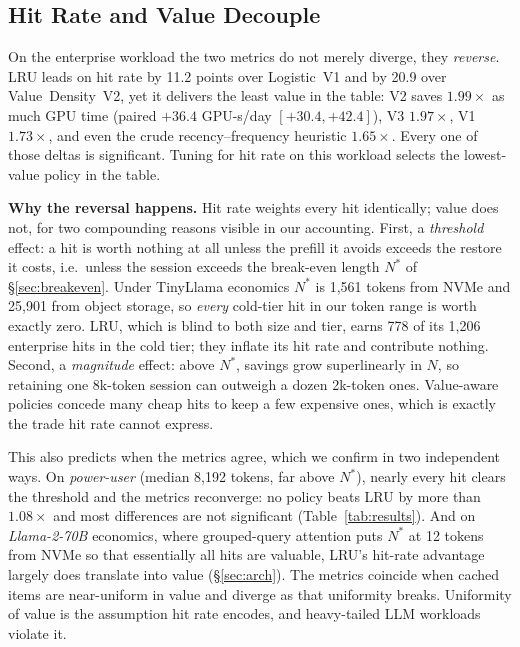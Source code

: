 \documentclass[letterpaper,twocolumn,10pt]{article}
\begin{document}
\subsection{Hit Rate and Value Decouple}
\label{sec:decouple}

On the enterprise workload the two metrics do not merely diverge, they \emph{reverse}. LRU leads on hit rate by 11.2 points over Logistic~V1 and by 20.9 over Value~Density~V2, yet it delivers the least value in the table: V2 saves $1.99\times$ as much GPU time (paired $+36.4$ GPU-s/day $[+30.4, +42.4]$), V3 $1.97\times$, V1 $1.73\times$, and even the crude recency--frequency heuristic $1.65\times$. Every one of those deltas is significant. Tuning for hit rate on this workload selects the lowest-value policy in the table.

\textbf{Why the reversal happens.} Hit rate weights every hit identically; value does not, for two compounding reasons visible in our accounting. First, a \emph{threshold} effect: a hit is worth nothing at all unless the prefill it avoids exceeds the restore it costs, i.e.\ unless the session exceeds the break-even length $N^{*}$ of \S\ref{sec:breakeven}. Under TinyLlama economics $N^{*}$ is 1,561 tokens from NVMe and 25,901 from object storage, so \emph{every} cold-tier hit in our token range is worth exactly zero. LRU, which is blind to both size and tier, earns 778 of its 1,206 enterprise hits in the cold tier; they inflate its hit rate and contribute nothing. Second, a \emph{magnitude} effect: above $N^{*}$, savings grow superlinearly in $N$, so retaining one 8k-token session can outweigh a dozen 2k-token ones. Value-aware policies concede many cheap hits to keep a few expensive ones, which is exactly the trade hit rate cannot express.

This also predicts when the metrics agree, which we confirm in two independent ways. On \emph{power-user} (median 8,192 tokens, far above $N^{*}$), nearly every hit clears the threshold and the metrics reconverge: no policy beats LRU by more than $1.08\times$ and most differences are not significant (Table~\ref{tab:results}). And on \emph{Llama-2-70B} economics, where grouped-query attention puts $N^{*}$ at 12 tokens from NVMe so that essentially all hits are valuable, LRU's hit-rate advantage largely does translate into value (\S\ref{sec:arch}). The metrics coincide when cached items are near-uniform in value and diverge as that uniformity breaks. Uniformity of value is the assumption hit rate encodes, and heavy-tailed LLM workloads violate it.
\end{document}
